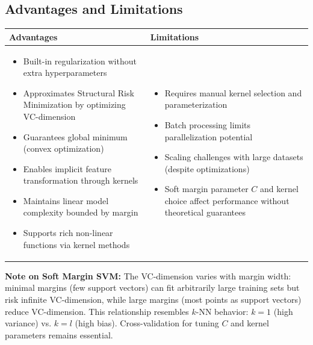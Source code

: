 \subsection{Advantages and Limitations}
\begin{footnotesize}
\begin{tabular}{p{} | p{}}
\toprule
\textbf{Advantages} & \textbf{Limitations} \\
\midrule
\midrule
\begin{itemize}[leftmargin=*,nosep]
    \item Built-in regularization without extra hyperparameters
    \item Approximates Structural Risk Minimization by optimizing VC-dimension
    \item Guarantees global minimum (convex optimization)
    \item Enables implicit feature transformation through kernels
    \item Maintains linear model complexity bounded by margin
    \item Supports rich non-linear functions via kernel methods
\end{itemize} &
\begin{itemize}[leftmargin=*,nosep]
    \item Requires manual kernel selection and parameterization
    \item Batch processing limits parallelization potential
    \item Scaling challenges with large datasets (despite optimizations)
    \item Soft margin parameter $C$ and kernel choice affect performance without theoretical guarantees
\end{itemize}\\
\bottomrule
\end{tabular}
\end{footnotesize}

\textbf{Note on Soft Margin SVM:} The VC-dimension varies with margin width: minimal margins (few support vectors) can fit arbitrarily large training sets but risk infinite VC-dimension, while large margins (most points as support vectors) reduce VC-dimension. This relationship resembles $k$-NN behavior: $k=1$ (high variance) vs. $k=l$ (high bias). Cross-validation for tuning $C$ and kernel parameters remains essential.
